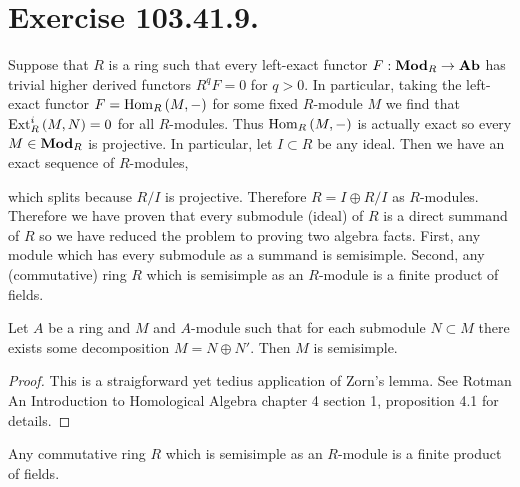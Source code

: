 \documentclass[12pt]{article}
\begin{document}
\section{Exercise 103.41.9.}

Suppose that $R$ is a ring such that every left-exact functor $F : \mathbf{Mod}_{R} \to \mathbf{Ab}$ has trivial higher derived functors $R^q F = 0$ for $q > 0$. In particular, taking the left-exact functor $F = \mathrm{Hom}_{R} \left( M, - \right)$ for some fixed $R$-module $M$ we find that $\mathrm{Ext}^{i}_{R} \left( M, N \right) = 0$ for all $R$-modules. Thus $\mathrm{Hom}_{R} \left( M, - \right)$ is actually exact so every $M \in \mathbf{Mod}_{R}$ is projective. In particular, let $I \subset R$ be any ideal. Then we have an exact sequence of $R$-modules,
\begin{center}
\end{center}
which splits because $R / I$ is projective. Therefore $R = I \oplus R / I$ as $R$-modules. Therefore we have proven that every submodule (ideal) of $R$ is a direct summand of $R$ so we have reduced the problem to proving two algebra facts. First, any module which has every submodule as a summand is semisimple. Second, any (commutative) ring $R$ which is semisimple as an $R$-module is a finite product of fields. 

\begin{proposition}
Let $A$ be a ring and $M$ and $A$-module such that for each submodule $N \subset M$ there exists some decomposition $M = N \oplus N'$. Then $M$ is semisimple.
\end{proposition}

\begin{proof}
This is a straigforward yet tedius application of Zorn's lemma. See Rotman An Introduction to Homological Algebra chapter 4 section 1, proposition 4.1 for details.
\end{proof}

\begin{theorem}
Any commutative ring $R$ which is semisimple as an $R$-module is a finite product of fields.
\end{theorem}
\end{document}
